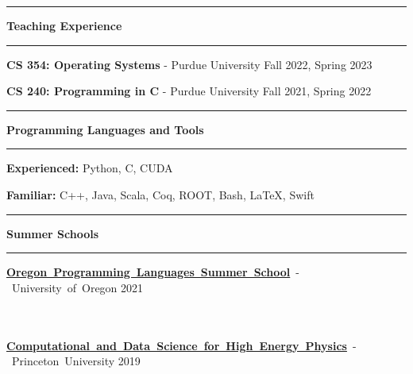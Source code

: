 \documentclass[10pt, letterpaper]{article}
\newcommand{\EducationEntry}[4]{
    \noindent\mbox{#1} \hfill
    \mbox{#2} \\
    \indent
    \mbox{\textit{#3}} \vspace{5pt}\\
    \parbox[t][\height][c]{\textwidth}{\small{#4}}
	\vspace{-14pt}
}
\newcommand{\Section}[1]{
    \Line \par
    \vspace{1pt}
    \textbf{\fontsize{13}{13}\selectfont #1} \par
    \vspace{-7pt}
    \Line \par
    \vspace{3pt}
}
\newcommand{\Line}{
\noindent\rule{\textwidth}{0.4pt}}
\begin{document}
\Section{Teaching Experience}
\vspace{-4pt}
\textbf{CS 354: Operating Systems} - Purdue University \hfill{Fall 2022, Spring 2023}

\textbf{CS 240: Programming in C} - Purdue University \hfill{Fall 2021, Spring 2022}
\vspace{-6pt}

%
%
\Section{Programming Languages and Tools}
\vspace{-4pt}
\textbf{Experienced:} Python, C, CUDA

\textbf{Familiar:} C++, Java, Scala, Coq, ROOT, Bash, \LaTeX, Swift
\vspace{-6pt}

%
%
\Section{Summer Schools}
\vspace{-4pt}
\indent \EducationEntry{\textbf{{\href{https://www.cs.uoregon.edu/research/summerschool/summer21/index.php}{Oregon Programming Languages Summer School}}} - University of Oregon}{2021}{}{}\vspace{-15pt}\\
\indent \EducationEntry{\textbf{{\href{https://codas-hep.org/}{Computational and Data Science for High Energy Physics}}} - Princeton University}{2019}{}{}\\

\vspace{-34pt}
\end{document}
